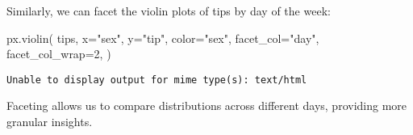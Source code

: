 \documentclass[
  letterpaper,
  DIV=11,
  numbers=noendperiod]{scrreprt}
\newenvironment{Shaded}{\begin{snugshade}}{\end{snugshade}}
\newcommand{\DecValTok}[1]{\textcolor[rgb]{0.68,0.00,0.00}{#1}}
\newcommand{\NormalTok}[1]{\textcolor[rgb]{0.00,0.23,0.31}{#1}}
\newcommand{\OperatorTok}[1]{\textcolor[rgb]{0.37,0.37,0.37}{#1}}
\newcommand{\StringTok}[1]{\textcolor[rgb]{0.13,0.47,0.30}{#1}}
\begin{document}
Similarly, we can facet the violin plots of tips by day of the week:

\begin{Shaded}
\begin{Highlighting}[]
\NormalTok{px.violin(}
\NormalTok{    tips,}
\NormalTok{    x}\OperatorTok{=}\StringTok{"sex"}\NormalTok{,}
\NormalTok{    y}\OperatorTok{=}\StringTok{"tip"}\NormalTok{,}
\NormalTok{    color}\OperatorTok{=}\StringTok{"sex"}\NormalTok{,}
\NormalTok{    facet\_col}\OperatorTok{=}\StringTok{"day"}\NormalTok{,}
\NormalTok{    facet\_col\_wrap}\OperatorTok{=}\DecValTok{2}\NormalTok{,}
\NormalTok{)}
\end{Highlighting}
\end{Shaded}

\begin{verbatim}
Unable to display output for mime type(s): text/html
\end{verbatim}

Faceting allows us to compare distributions across different days,
providing more granular insights.
\end{document}
